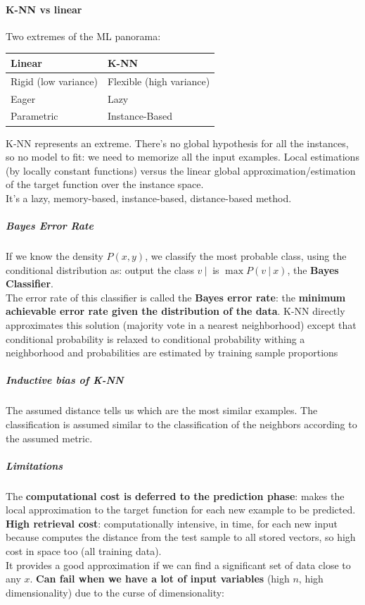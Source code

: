\documentclass[10pt]{report}
\begin{document}
\paragraph{K-NN vs linear} Two extremes of the ML panorama:
\begin{center}
	\begin{tabular}{l | l}
		\textbf{Linear} & \textbf{K-NN}\\
		\hline
		Rigid (low variance) & Flexible (high variance)\\
		Eager & Lazy\\
		Parametric & Instance-Based
	\end{tabular}
\end{center}
K-NN represents an extreme. There's no global hypothesis for all the instances, so no model to fit: we need to memorize all the input examples. Local estimations (by locally constant functions) versus the linear global approximation/estimation of the target function over the instance space.\\
It's a lazy, memory-based, instance-based, distance-based method.
\subparagraph{Bayes Error Rate} If we know the density $P(x,y)$, we classify the most probable class, using the conditional distribution as: output the class $v\:|\:$ is $\max P(v\:|\:x)$, the \textbf{Bayes Classifier}.\\
The error rate of this classifier is called the \textbf{Bayes error rate}: the \textbf{minimum achievable error rate given the distribution of the data}. K-NN directly approximates this solution (majority vote in a nearest neighborhood) except that conditional probability is relaxed to conditional probability withing a neighborhood and probabilities are estimated by training sample proportions
\subparagraph{Inductive bias of K-NN} The assumed distance tells us which are the most similar examples. The classification is assumed similar to the classification of the neighbors according to the assumed metric.
\subparagraph{Limitations} The \textbf{computational cost is deferred to the prediction phase}: makes the local approximation to the target function for each new example to be predicted.\\
\textbf{High retrieval cost}: computationally intensive, in time, for each new input because computes the distance from the test sample to all stored vectors, so high cost in space too (all training data).\\
It provides a good approximation if we can find a significant set of data close to any $x$. \textbf{Can fail when we have a lot of input variables} (high $n$, high dimensionality) due to the curse of dimensionality:
\end{document}

